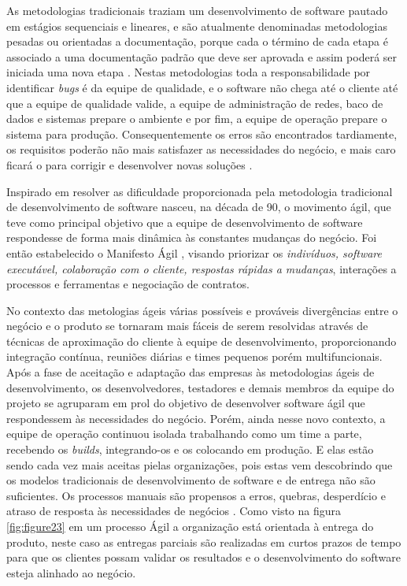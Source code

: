As metodologias tradicionais traziam um desenvolvimento de software pautado em estágios sequenciais e lineares, e são atualmente denominadas metodologias pesadas ou orientadas a documentação, porque cada o término de cada etapa é associado a uma documentação padrão que deve ser aprovada e assim poderá ser iniciada uma nova etapa \cite{ROYCE1970}. Nestas metodologias toda a responsabilidade por identificar \textit{bugs} é da equipe de qualidade, e o software não chega até o cliente até que a equipe de qualidade valide, a equipe de administração de redes, baco de dados e sistemas prepare o ambiente e por fim, a equipe de operação prepare o sistema para produção. Consequentemente os erros são encontrados tardiamente, os requisitos poderão não mais satisfazer as necessidades do negócio, e mais caro ficará o para corrigir e desenvolver novas soluções \cite{PRESSMAN2011}.

Inspirado em resolver as dificuldade proporcionada pela metodologia tradicional de desenvolvimento de software nasceu, na década de 90, o movimento ágil, que teve como principal objetivo que a equipe de desenvolvimento de software respondesse de forma mais dinâmica às constantes mudanças do negócio. Foi então estabelecido o Manifesto Ágil \cite{Beck2001}, visando priorizar os \textit{indivíduos, software executável, colaboração com o cliente, respostas rápidas a mudanças}, interações a processos e ferramentas e negociação de contratos.

No contexto das metologias ágeis várias possíveis e prováveis divergências entre o negócio e o produto se tornaram mais fáceis de serem resolvidas através de técnicas de aproximação do cliente à equipe de desenvolvimento, proporcionando integração contínua, reuniões diárias e times pequenos porém multifuncionais. Após a fase de aceitação e adaptação das empresas às metodologias ágeis de desenvolvimento, os desenvolvedores, testadores e demais membros da equipe do projeto se agruparam em prol do objetivo de desenvolver software ágil que respondessem às necessidades do negócio. Porém, ainda nesse novo contexto, a equipe de operação continuou isolada trabalhando como um time a parte, recebendo os \textit{builds}, integrando-os e os colocando em produção. E elas estão sendo cada vez mais aceitas pielas organizações, pois estas vem descobrindo que os modelos tradicionais de desenvolvimento de software e de entrega não são suficientes. Os processos manuais são propensos a erros, quebras, desperdício e atraso de resposta às necessidades de negócios \cite{WOOTTON2013}. Como visto na figura \ref{fig:figure23} em um processo Ágil a organização está orientada à entrega do produto, neste caso as entregas parciais são realizadas em curtos prazos de tempo para que os clientes possam validar os resultados e o desenvolvimento do software esteja alinhado ao negócio.


